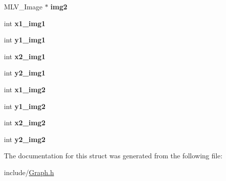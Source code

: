 \begin{DoxyCompactItemize}
\item 
\hypertarget{struct_interface_ab15204ae75286d7ae15a331ef44b8df2}{M\+L\+V\+\_\+\+Image $\ast$ {\bfseries img2}}\label{struct_interface_ab15204ae75286d7ae15a331ef44b8df2}

\item 
\hypertarget{struct_interface_ab8b9526c6b89e56c0fe75e0e0fcc9097}{int {\bfseries x1\+\_\+img1}}\label{struct_interface_ab8b9526c6b89e56c0fe75e0e0fcc9097}

\item 
\hypertarget{struct_interface_a30b87599b6283bdf6abf98f72b418e89}{int {\bfseries y1\+\_\+img1}}\label{struct_interface_a30b87599b6283bdf6abf98f72b418e89}

\item 
\hypertarget{struct_interface_a0e1117560d107f29eb052d5f5a185529}{int {\bfseries x2\+\_\+img1}}\label{struct_interface_a0e1117560d107f29eb052d5f5a185529}

\item 
\hypertarget{struct_interface_a583c3875b5e29e567d5214ddd69e82ed}{int {\bfseries y2\+\_\+img1}}\label{struct_interface_a583c3875b5e29e567d5214ddd69e82ed}

\item 
\hypertarget{struct_interface_abacd096a3930dc6acbb672344c378557}{int {\bfseries x1\+\_\+img2}}\label{struct_interface_abacd096a3930dc6acbb672344c378557}

\item 
\hypertarget{struct_interface_a90652b93a765ffd2acda2d18ee4948d1}{int {\bfseries y1\+\_\+img2}}\label{struct_interface_a90652b93a765ffd2acda2d18ee4948d1}

\item 
\hypertarget{struct_interface_a715ea42d732485f5e6f00e033268a468}{int {\bfseries x2\+\_\+img2}}\label{struct_interface_a715ea42d732485f5e6f00e033268a468}

\item 
\hypertarget{struct_interface_af8055d1621be25765dfcba57214d510d}{int {\bfseries y2\+\_\+img2}}\label{struct_interface_af8055d1621be25765dfcba57214d510d}

\end{DoxyCompactItemize}


The documentation for this struct was generated from the following file\+:\begin{DoxyCompactItemize}
\item 
include/\hyperlink{_graph_8h}{Graph.\+h}\end{DoxyCompactItemize}
